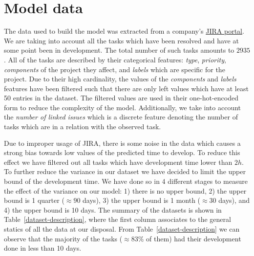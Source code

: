 \documentclass[conference,compsoc]{IEEEtran}
\begin{document}


\section{Model data}
The data used to build the model was extracted from a company's \href{https://www.atlassian.com/software/jira}{JIRA portal}. We are taking into account all the tasks which have been resolved and have at some point been in development. The total number of such tasks amounts to $2935$. All of the tasks are described by their categorical features: \textit{type}, \textit{priority}, \textit{components} of the project they affect, and \textit{labels} which are specific for the project. Due to their high cardinality, the values of the \textit{components} and \textit{labels} features have been filtered such that there are only left values which have at least 50 entries in the dataset. The filtered values are used in their one-hot-encoded form to reduce the complexity of the model. Additionally, we take into account the \textit{number of linked issues} which is a discrete feature denoting the number of tasks which are in a relation with the observed task.

Due to improper usage of JIRA, there is some noise in the data which causes a strong bias towards low values of the predicted time to develop. To reduce this effect we have filtered out all tasks which have development time lower than $2h$. To further reduce the variance in our dataset we have decided to limit the upper bound of the development time. We have done so in 4 different stages to measure the effect of the variance on our model: 1) there is no upper bound, 2) the upper bound is 1 quarter ($\approx 90$ days), 3) the upper bound is 1 month ($\approx 30$ days), and 4) the upper bound is 10 days. The summary of the datasets is shown in Table~\ref{dataset-description}, where the first column associates to the general statics of all the data at our disposal. From Table~\ref{dataset-description} we can observe that the majority of the tasks ($\approx 83\%$ of them) had their development done in less than 10 days.
\end{document}
